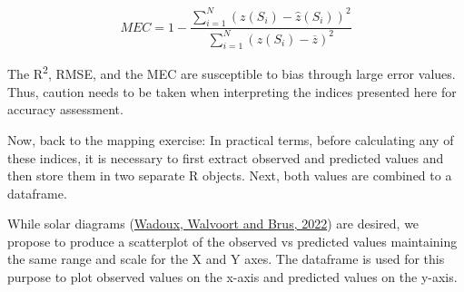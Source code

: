 \documentclass[
  10pt,
  b5paper,
  oneside]{book}
\newenvironment{Shaded}{\begin{snugshade}}{\end{snugshade}}
\newcommand{\CommentTok}[1]{\textcolor[rgb]{0.56,0.35,0.01}{\textit{#1}}}
\newcommand{\FunctionTok}[1]{\textcolor[rgb]{0.00,0.00,0.00}{#1}}
\newcommand{\NormalTok}[1]{#1}
\newcommand{\OtherTok}[1]{\textcolor[rgb]{0.56,0.35,0.01}{#1}}
\newcommand{\SpecialCharTok}[1]{\textcolor[rgb]{0.00,0.00,0.00}{#1}}
\begin{document}
\begin{equation} 
  MEC = 1 - \frac{\sum_{i=1}^{N}(z(S_{i})-\hat{z}(S_{i}))^2}{\sum_{i=1}^{N}(z(S_{i})-\overline{z})^2}
  \label{eq:mec}
\end{equation}

The R\textsuperscript{2}, RMSE, and the MEC are susceptible to bias through large error values. Thus, caution needs to be taken when interpreting the indices presented here for accuracy assessment.

Now, back to the mapping exercise: In practical terms, before calculating any of these indices, it is necessary to first extract observed and predicted values and then store them in two separate R objects. Next, both values are combined to a dataframe.

\begin{Shaded}
\end{Shaded}

While solar diagrams (\protect\hyperlink{ref-Wadoux2022}{Wadoux, Walvoort and Brus, 2022}) are desired, we propose to produce a scatterplot of the observed vs predicted values maintaining the same range and scale for the X and Y axes. The dataframe is used for this purpose to plot observed values on the x-axis and predicted values on the y-axis.
\end{document}

